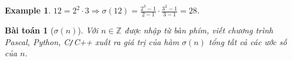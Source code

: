 \documentclass{article}
\newtheorem{baitoan}{Bài toán}
\newtheorem{example}{Example}
\begin{document}
\begin{example}
	$12 = 2^2\cdot3\Rightarrow\sigma(12) = \frac{2^3 - 1}{2 - 1}\cdot\frac{3^2 - 1}{3 - 1} = 28$.
\end{example}

\begin{baitoan}[$\sigma(n)$]
	Với $n\in\mathbb{Z}$ được nhập từ bàn phím, viết chương trình {\sf Pascal, Python, C\texttt{/}C++} xuất ra giá trị của hàm $\sigma(n)$ tổng tất cả các ước số của $n$.
\end{baitoan}


\printbibliography[heading=bibintoc]
	
\end{document}
